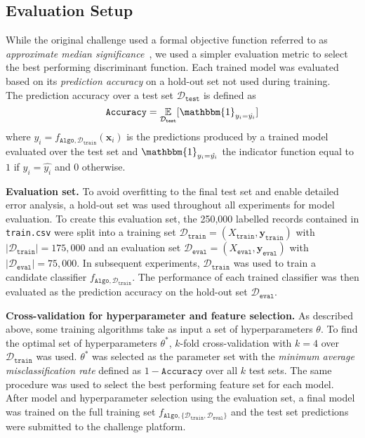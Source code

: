 \documentclass[10pt,conference,compsocconf]{IEEEtran}
\newcommand{\parabf}[1]{\vspace{1mm}\noindent\textbf{#1}}
\newcommand{\Deval}{\mathcal{D}_{\mathtt{eval}}}
\newcommand{\Dtrain}{\mathcal{D}_{\mathtt{train}}}
\newcommand{\Dtest}{\mathcal{D}_{\mathtt{test}}}
\newcommand{\Xtrain}{X_{\mathtt{train}}}
\newcommand{\ytrain}{\mathbf{y}_{\mathtt{train}}}
\newcommand{\Xeval}{X_{\mathtt{eval}}}
\newcommand{\yeval}{\mathbf{y}_{\mathtt{eval}}}
\newcommand{\features}{\mathbf{x}_i}
\newcommand{\target}{y_i}
\newcommand{\classifier}[2]{f_{#1, #2}}
\newcommand{\Train}{\mathtt{Algo}}
\begin{document}
\subsection{Evaluation Setup}
While the original challenge used a formal objective function referred to as \emph{approximate median significance}~\cite{HiggsML}, we used a simpler evaluation metric to select the best performing discriminant function. Each trained model was evaluated based on its \emph{prediction accuracy} on a hold-out set not used during training.\\
The prediction accuracy over a test set $\Dtest$ is defined as
\begin{equation}
	\mathtt{Accuracy} = \underset{\Dtest}{\mathbb{E}}[ \mathbbm{1}_{\target = \hat{\target}} ]
\end{equation}
where $\hat{\target} = \classifier{\Train}{\Dtrain}(\features)$ is the predictions produced by a trained model evaluated over the test set and $\mathbbm{1}_{\target = \hat{\target}}$ the indicator function equal to $1$ if $\target = \hat{\target}$ and $0$ otherwise.

\parabf{Evaluation set.} To avoid overfitting to the final test set and enable detailed error analysis, a hold-out set was used throughout all experiments for model evaluation. To create this evaluation set, the 250,000 labelled records contained in \texttt{train.csv} were split into a training set $\Dtrain = (\Xtrain, \ytrain)$ with $|\Dtrain| = 175,000$ and an evaluation set $\Deval = (\Xeval, \yeval)$ with $|\Deval| = 75,000$. In subsequent experiments, $\Dtrain$ was used to train a candidate classifier $\classifier{\Train}{\Dtrain}$. The performance of each trained classifier was then evaluated as the prediction accuracy on the hold-out set $\Deval$.

\parabf{Cross-validation for hyperparameter and feature selection.} As described above, some training algorithms take as input a set of hyperparameters $\theta$. To find the optimal set of hyperparameters $\theta^*$, $k$-fold cross-validation with $k=4$ over $\Dtrain$ was used. $\theta^*$ was selected as the parameter set with the \emph{minimum average misclassification rate} defined as $1 - \mathtt{Accuracy}$ over all $k$ test sets. The same procedure was used to select the best performing feature set for each model.\\

After model and hyperparameter selection using the evaluation set, a final model was trained on the full training set
$\classifier{\Train}{\{ \Dtrain, \Deval\}}$ and the test set predictions were submitted to the challenge platform. 
\end{document}

